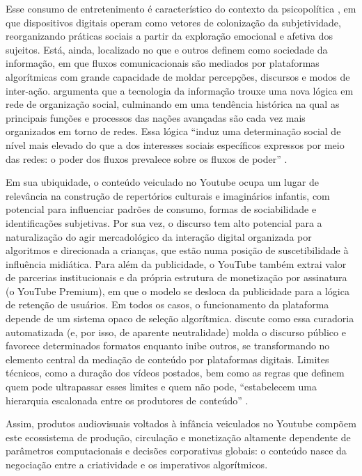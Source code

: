 \documentclass[portuguese]{textolivre}
\begin{document}
Esse consumo de entretenimento é característico do contexto da psicopolítica \cite{Han2018Psicopolitica}, em que dispositivos digitais operam como vetores de colonização da subjetividade, reorganizando práticas sociais a partir da exploração emocional e afetiva dos sujeitos. Está, ainda, localizado no que \textcite{Castells2000RiseNetworkSociety} e outros definem como sociedade da informação, em que fluxos comunicacionais são mediados por plataformas algorítmicas com grande capacidade de moldar percepções, discursos e modos de inter-ação. \textcite{Castells2000RiseNetworkSociety} argumenta que a tecnologia da informação trouxe uma nova lógica em rede de organização social, culminando em uma tendência histórica na qual as principais funções e processos das nações avançadas são cada vez mais organizados em torno de redes. Essa lógica “induz uma determinação social de nível mais elevado do que a dos interesses sociais específicos expressos por meio das redes: o poder dos fluxos prevalece sobre os fluxos de poder” \cite[p. 500]{Castells2000RiseNetworkSociety}.

Em sua ubiquidade, o conteúdo veiculado no Youtube ocupa um lugar de relevância na construção de repertórios culturais e imaginários infantis, com potencial para influenciar padrões de consumo, formas de sociabilidade e identificações subjetivas. Por sua vez, o discurso tem alto potencial para a naturalização do agir mercadológico da interação digital organizada por algoritmos e direcionada a crianças, que estão numa posição de suscetibilidade à influência midiática. Para além da publicidade, o YouTube também extrai valor de parcerias institucionais e da própria estrutura de monetização por assinatura (o YouTube Premium), em que o modelo se desloca da publicidade para a lógica de retenção de usuários. Em todos os casos, o funcionamento da plataforma depende de um sistema opaco de seleção algorítmica. \textcite{Gillespie2018CustodiansInternet} discute como essa curadoria automatizada (e, por isso, de aparente neutralidade) molda o discurso público e favorece determinados formatos enquanto inibe outros, se transformando no elemento central da mediação de conteúdo por plataformas digitais. Limites técnicos, como a duração dos vídeos postados, bem como as regras que definem quem pode ultrapassar esses limites e quem não pode, “estabelecem uma hierarquia escalonada entre os produtores de conteúdo” \cite[p. 189, tradução própria]{Gillespie2018CustodiansInternet}.

Assim, produtos audiovisuais voltados à infância veiculados no Youtube compõem este ecossistema de produção, circulação e monetização altamente dependente de parâmetros computacionais e decisões corporativas globais: o conteúdo nasce da negociação entre a criatividade e os imperativos algorítmicos.
\end{document}
